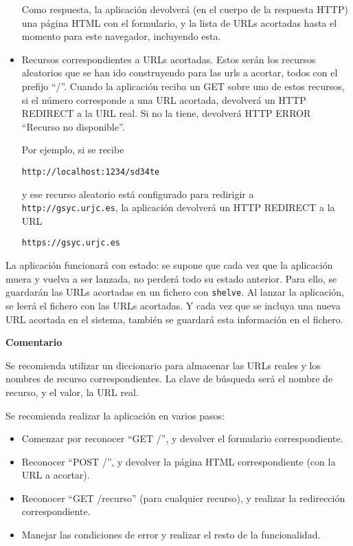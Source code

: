 \begin{itemize}
Como respuesta, la aplicación devolverá (en el cuerpo de la respuesta HTTP) una página HTML con el formulario, y la lista de URLs acortadas hasta el momento para este navegador, incluyendo esta.


\item Recursos correspondientes a URLs acortadas. Estos serán los recursos aleatorios que se han ido construyendo para las urls a acortar, todos con el prefijo ``/''. Cuando la aplicación reciba un GET sobre uno de estos recursos, si el número corresponde a una URL acortada, devolverá un HTTP REDIRECT a la URL real. Si no la tiene, devolverá HTTP ERROR ``Recurso no disponible''.

Por ejemplo, si se recibe 

\verb|http://localhost:1234/sd34te|

y ese recurso aleatorio está configurado para redirigir a \texttt{http://gsyc.urjc.es}, la aplicación devolverá un HTTP REDIRECT a la URL

\verb|https://gsyc.urjc.es|

\end{itemize}

La aplicación funcionará con estado: se supone que cada vez que la aplicación muera y vuelva a ser lanzada, no perderá todo su estado anterior. Para ello, se guardarán las URLs acortadas en un fichero con \texttt{shelve}. Al lanzar la aplicación, se leerá el fichero con las URLs acortadas. Y cada vez que se incluya una nueva URL acortada en el sistema, también se guardará esta información en el fichero.

\textbf{Comentario}

Se recomienda utilizar un diccionario para almacenar las URLs reales y los nombres de recurso correspondientes. La clave de búsqueda será el nombre de recurso, y el valor, la URL real.

Se recomienda realizar la aplicación en varios pasos:

\begin{itemize}
\item Comenzar por reconocer ``GET /'', y devolver el formulario correspondiente.
\item Reconocer ``POST /'', y devolver la página HTML correspondiente (con la URL a acortar).
\item Reconocer ``GET /recurso'' (para cualquier recurso), y realizar la redirección correspondiente.
\item Manejar las condiciones de error y realizar el resto de la funcionalidad.
\end{itemize}


